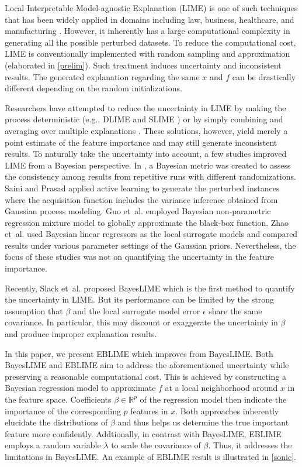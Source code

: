 \documentclass{article}
\theoremstyle{plain}
\theoremstyle{definition}
\theoremstyle{remark}
\begin{document}
Local Interpretable Model-agnostic Explanation (LIME) \cite{lime} is one of such techniques that has been widely applied in domains including law, business, healthcare, and manufacturing \cite{gramegna2021,zafar2019dlime,zhong2022}. However, it inherently has a large computational complexity in generating all the possible perturbed datasets. To reduce the computational cost, LIME is conventionally implemented with random sampling and approximation (elaborated in \cref{prelim}). Such treatment induces uncertainty and inconsistent results. The generated explanation regarding the same $x$ and $f$ can be drastically different depending on the random initializations. 

Researchers have attempted to reduce the uncertainty in LIME by making the process deterministic (e.g., DLIME \cite{zafar2019dlime} and SLIME \cite{zhou2021}) or by simply combining and averaging over multiple explanations \cite{zhang2019}. These solutions, however, yield merely a point estimate of the feature importance and may still generate inconsistent results. To naturally take the uncertainty into account, a few studies improved LIME from a Bayesian perspective. In \cite{visani2022}, a Bayesian metric was created to assess the consistency among results from repetitive runs with different randomizations. Saini and Prasad  applied active learning to generate the perturbed instances where the acquisition function includes the variance inference obtained from Gaussian process modeling. Guo et~al.  employed Bayesian non-parametric regression mixture model to globally approximate the black-box function. Zhao et~al.  used Bayesian linear regressors as the local surrogate models and compared results under various parameter settings of the Gaussian priors. Nevertheless, the focus of these studies was not on quantifying the uncertainty in the feature importance.

Recently, Slack et~al.  proposed BayesLIME which is the first method to quantify the uncertainty in LIME. But its performance can be limited by the strong assumption that $\beta$ and the local surrogate model error $\epsilon$ share the same covariance. In particular, this may discount or exaggerate the uncertainty in $\beta$ and produce improper explanation results. 

In this paper, we present EBLIME which improves from BayesLIME. Both BayesLIME and EBLIME aim to address the aforementioned uncertainty while preserving a reasonable computational cost. This is achieved by constructing a Bayesian regression model to approximate $f$ at a local neighborhood around $x$ in the feature space. Coefficients $\beta \in \mathbb{R}^{p}$ of the regression model then indicate the importance of the corresponding $p$ features in $x$. Both approaches inherently elucidate the distributions of $\beta$ and thus helps us determine the true important feature more confidently. Addtionally, in contrast with BayesLIME, EBLIME employs a random variable $\lambda$ to scale the covariance of $\beta$. Thus, it addresses the limitations in BayesLIME. An example of EBLIME result is illustrated in \cref{sonic}.
\end{document}
